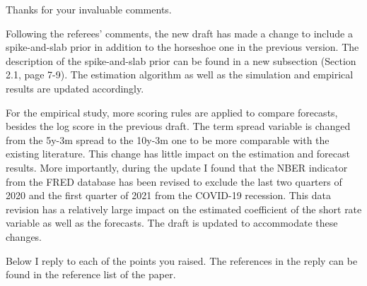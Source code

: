 \documentclass[12pt]{article}
\begin{document}
Thanks for your invaluable comments. 

Following the referees' comments, the new draft has made a change to include a spike-and-slab prior in addition to the horseshoe one in the previous version. The description of the spike-and-slab prior can be found in a new subsection (Section 2.1, page 7-9). The estimation algorithm as well as the simulation and empirical results are updated accordingly.

For the empirical study, more scoring rules are applied to compare forecasts, besides the log score in the previous draft. The term spread variable is changed from the 5y-3m spread to the 10y-3m one to be more comparable with the existing literature. This change has little impact on the estimation and forecast results. More importantly, during the update I found that the NBER indicator from the FRED database has been revised to exclude the last two quarters of 2020 and the first quarter of 2021 from the COVID-19 recession. This data revision has a relatively large impact on the estimated coefficient of the short rate variable as well as the forecasts. The draft is updated to accommodate these changes. 

Below I reply to each of the points you raised. The references in the reply can be found in the reference list of the paper.
\end{document}

